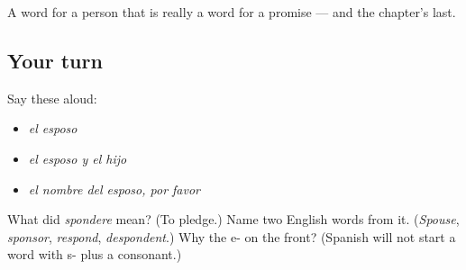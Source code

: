 \begin{grammarlens}[title={What you've built}]
A word for a person that is really a word for a promise --- and the chapter's last.
\end{grammarlens}

\subsection*{Your turn}
Say these aloud:

\begin{itemize}
\raggedright
  \item \emph{el esposo}
  \item \emph{el esposo y el hijo}
  \item \emph{el nombre del esposo, por favor}
\end{itemize}

\begin{tcolorbox}[breakable,colback=teal!4,colframe=teal!35!black,title={Before you move on}]
What did \emph{spondere} mean? (To pledge.) Name two English words from it. (\emph{Spouse}, \emph{sponsor}, \emph{respond}, \emph{despondent}.) Why the e- on the front? (Spanish will not start a word with s- plus a consonant.)
\end{tcolorbox}
